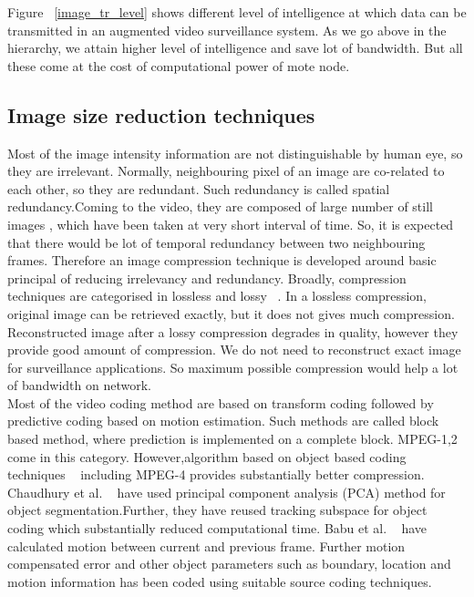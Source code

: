 Figure ~\ref{image_tr_level} shows different level of intelligence at
which data can be transmitted in an augmented video surveillance
system. As we go above in the hierarchy, we attain higher level of
intelligence and save lot of bandwidth. But all these come at the cost
of computational power of mote node.

\subsection{Image size reduction techniques}
Most of the image intensity information are not distinguishable by human
eye, so they are irrelevant. Normally, neighbouring pixel of an image
are co-related to each other, so they are redundant. Such redundancy is
called spatial redundancy.Coming to the video, they are composed of
large number of still images , which have been taken at very short
interval of time. So, it is expected that there would be lot of temporal
redundancy between two neighbouring frames.  Therefore an image
compression technique is developed around basic principal of reducing
irrelevancy and redundancy. Broadly, compression techniques are
categorised in lossless and lossy ~\cite{6}. In a lossless compression, original
image can be retrieved exactly, but it does not gives much compression.
Reconstructed image after a lossy compression degrades in quality,
however they provide good amount of compression. We do not need to
reconstruct exact image for surveillance applications. So maximum
possible compression would help a lot of bandwidth on network.\\

Most of the video coding method are based on transform coding followed
by predictive coding based on motion estimation. Such methods are called
block based method, where prediction is implemented on a complete block.
MPEG-1,2 come in this category. However,algorithm based on object based
coding techniques ~\cite{7, 8} including MPEG-4 provides substantially
better compression. Chaudhury et al. ~\cite{7} have used principal
component analysis (PCA) method for object segmentation.Further, they
have reused tracking subspace for object coding which substantially
reduced computational time. Babu et al. ~\cite{8} have calculated motion
between current and previous frame. Further motion compensated error and
other object parameters such as boundary, location and motion
information has been coded using suitable source coding techniques.  

